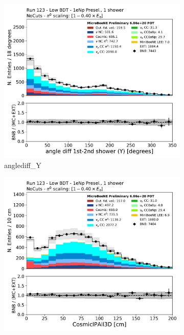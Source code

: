 \begin{figure}[H]
    \centering
    \begin{subfigure}{0.3\textwidth}
    \includegraphics[width=1.0\textwidth]{Sidebands/Figures/1eNp/LPID_NPOneShr_None_pi0e40/anglediff_Y.pdf}
    \caption{anglediff\_Y}
    \end{subfigure}
    \begin{subfigure}{0.3\textwidth}
    \includegraphics[width=1.0\textwidth]{Sidebands/Figures/1eNp/LPID_NPOneShr_None_pi0e40/CosmicIPAll3D.pdf}

\end{subfigure}
\end{figure}
